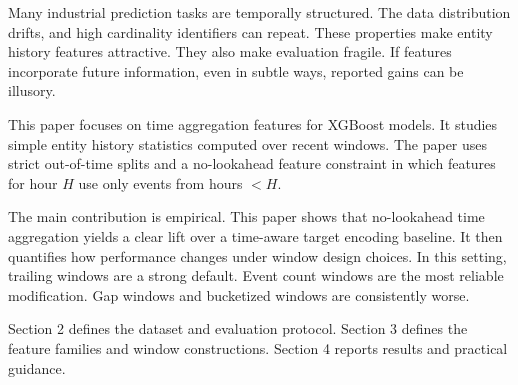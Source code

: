 Many industrial prediction tasks are temporally structured.
The data distribution drifts, and high cardinality identifiers can repeat.
These properties make entity history features attractive.
They also make evaluation fragile.
If features incorporate future information, even in subtle ways, reported gains can be illusory.

This paper focuses on time aggregation features for XGBoost models.
It studies simple entity history statistics computed over recent windows.
The paper uses strict out-of-time splits and a no-lookahead feature constraint in which features for hour $H$ use only events from hours $< H$.

The main contribution is empirical.
This paper shows that no-lookahead time aggregation yields a clear lift over a time-aware target encoding baseline.
It then quantifies how performance changes under window design choices.
In this setting, trailing windows are a strong default.
Event count windows are the most reliable modification.
Gap windows and bucketized windows are consistently worse.

Section 2 defines the dataset and evaluation protocol.
Section 3 defines the feature families and window constructions.
Section 4 reports results and practical guidance.
